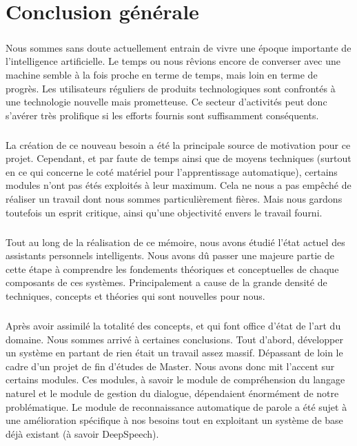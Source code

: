 \chapter*{Conclusion générale}

\paragraph{}
Nous sommes sans doute actuellement entrain de vivre une époque importante de l'intelligence artificielle. Le temps ou nous rêvions encore de converser avec une machine semble à la fois proche en terme de temps, mais loin en terme de progrès. Les utilisateurs réguliers de produits technologiques sont confrontés à une technologie nouvelle mais prometteuse. Ce secteur d'activités peut donc s'avérer très prolifique si les efforts fournis sont suffisamment conséquents.

\paragraph{}
La création de ce nouveau besoin a été la principale source de motivation pour ce projet. Cependant, et par faute de temps ainsi que de moyens techniques (surtout en ce qui concerne le coté matériel pour l'apprentissage automatique), certains modules n'ont pas étés exploités à leur maximum. Cela ne nous a pas empêché de réaliser un travail dont nous sommes particulièrement fières. Mais nous gardons toutefois un esprit critique, ainsi qu'une objectivité envers le travail fourni. 

\paragraph{}
Tout au long de la réalisation de ce mémoire, nous avons étudié l'état actuel des assistants personnels intelligents. Nous avons dû passer une majeure partie de cette étape à comprendre les fondements théoriques et conceptuelles de chaque composants de ces systèmes. Principalement a cause de la grande densité de techniques, concepts et théories qui sont nouvelles pour nous.

\paragraph{}
Après avoir assimilé la totalité des concepts, et qui font office d'état de l'art du domaine. Nous sommes arrivé à certaines conclusions. Tout d'abord, développer un système en partant de rien était un travail assez massif. Dépassant de loin le cadre d'un projet de fin d'études de Master. Nous avons donc mit l'accent sur certains modules. Ces modules, à savoir le module de compréhension du langage naturel et le module de gestion du dialogue, dépendaient énormément de notre problématique. Le module de reconnaissance automatique de parole a été sujet à une amélioration spécifique à nos besoins tout en exploitant un système de base déjà existant (à savoir DeepSpeech).


